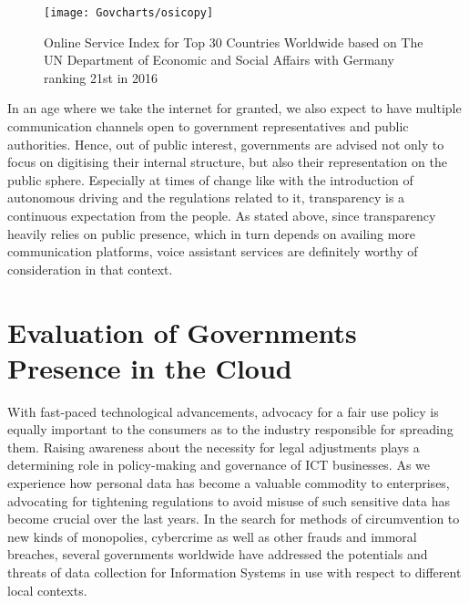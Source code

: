 \begin{figure}[h]
	\centering
	\caption[United Nations Online Service Index (Top 30)]{Online Service Index for Top 30 Countries Worldwide based on The UN Department of Economic and Social Affairs \cite{un:egovReport} with Germany ranking 21st in 2016}
	\label{un:osi}
	\texttt{[image: Govcharts/osicopy]} 
\end{figure}

In an age where we take the internet for granted,
we also expect to have multiple communication channels open to government representatives and public authorities. 
%
Hence, out of public interest, governments are advised not only to focus on digitising their internal structure, but also their representation on the public sphere.
Especially at times of change like with the introduction of autonomous driving and the regulations related to it, transparency is a continuous expectation from the people. As stated above, since transparency heavily relies on public presence, which in turn depends on availing more communication platforms, voice assistant services are definitely worthy of consideration in that context.


\section{Evaluation of Governments Presence in the Cloud}
With fast-paced technological advancements, advocacy for a fair use policy is equally important to the consumers as to the industry responsible for spreading them. Raising awareness about the necessity for legal adjustments %
plays a determining role in policy-making and governance of ICT businesses. As we experience how personal data has become a valuable commodity to enterprises, advocating for tightening regulations to avoid misuse of such sensitive data has become crucial over the last years. In the search for methods of circumvention to new kinds of monopolies, cybercrime as well as other frauds and immoral breaches, several governments worldwide have addressed the potentials and threats of data collection for Information Systems in use with respect to different local contexts. 





